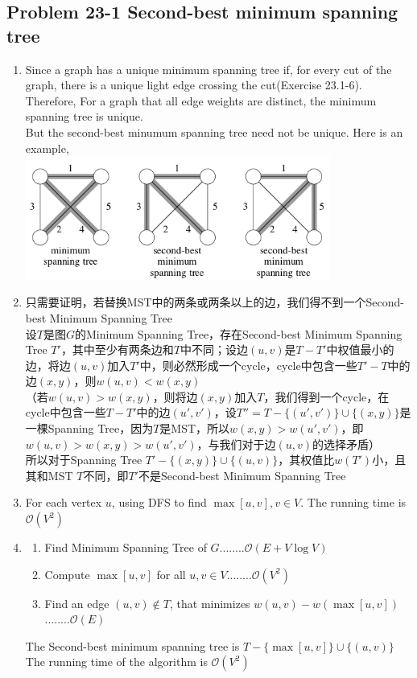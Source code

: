 \subsection*{Problem 23-1 Second-best minimum spanning tree}
\begin{enumerate}
	\item	Since a graph has a unique minimum spanning tree if, for every cut of the graph, there is a unique light edge crossing the cut(Exercise 23.1-6). Therefore, For a graph that all edge weights are distinct, the minimum spanning tree is unique. \\
		But the second-best minumum spanning tree need not be unique. Here is an example, \\
		\includegraphics[width=10cm]{chapter23/second-best-mst.png} \\
	\item	只需要证明，若替换MST中的两条或两条以上的边，我们得不到一个Second-best Minimum Spanning Tree \\
		设$T$是图$G$的Minimum Spanning Tree，存在Second-best Minimum Spanning Tree $T'$，其中至少有两条边和$T$中不同；设边$(u, v)$是$T - T'$中权值最小的边，将边$(u, v)$加入$T'$中，则必然形成一个cycle，cycle中包含一些$T' - T$中的边$(x, y)$，则$w(u, v) < w(x, y)$ \\
		（若$w(u, v) > w(x, y)$，则将边$(x, y)$加入$T$，我们得到一个cycle，在cycle中包含一些$T - T'$中的边$(u', v')$，设$T'' = T - \{(u', v')\} \cup \{(x, y)\}$是一棵Spanning Tree，因为$T$是MST，所以$w(x, y) > w(u', v')$，即$w(u, v) > w(x, y) > w(u', v')$，与我们对于边$(u, v)$的选择矛盾） \\
		所以对于Spanning Tree $T' - \{(x, y)\} \cup \{(u, v)\}$，其权值比$w(T')$小，且其和MST $T$不同，即$T'$不是Second-best Minimum Spanning Tree
	\item	For each vertex $u$, using DFS to find $\max[u, v], v \in V$. The running time is $\mathcal{O}(V^2)$
	\item	\begin{enumerate}
			\item	Find Minimum Spanning Tree of $G$........$\mathcal{O}(E + V \log V)$
			\item	Compute $\max[u, v]$ for all $u, v \in V$........$\mathcal{O}(V^2)$
			\item	Find an edge $(u, v) \notin T$, that minimizes $w(u, v) - w(\max[u, v])$........$\mathcal{O}(E)$
		\end{enumerate}
		The Second-best minimum spanning tree is $T - \{\max[u, v]\} \cup \{(u, v)\}$ \\
		The running time of the algorithm is $\mathcal{O}(V^2)$
\end{enumerate}

